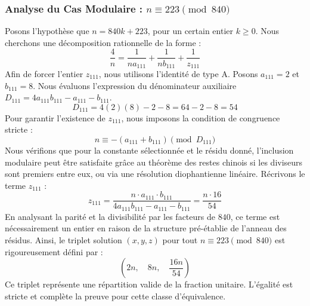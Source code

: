 \documentclass[11pt,a4paper]{article}
\theoremstyle{definition}
\theoremstyle{remark}
\begin{document}
\subsubsection{Analyse du Cas Modulaire : $n \equiv 223 \pmod{840}$}
Posons l'hypoth\`ese que $n = 840k + 223$, pour un certain entier $k \ge 0$. Nous cherchons une d\'ecomposition rationnelle de la forme :
\begin{equation}
\frac{4}{n} = \frac{1}{n a_{111}} + \frac{1}{n b_{111}} + \frac{1}{z_{111}}
\end{equation}
Afin de forcer l'entier $z_{111}$, nous utilisons l'identit\'e de type A. Posons $a_{111} = 2$ et $b_{111} = 8$.
Nous \'evaluons l'expression du d\'enominateur auxiliaire $D_{111} = 4a_{111}b_{111} - a_{111} - b_{111}$.
\begin{equation}
D_{111} = 4(2)(8) - 2 - 8 = 64 - 2 - 8 = 54
\end{equation}
Pour garantir l'existence de $z_{111}$, nous imposons la condition de congruence stricte :
\begin{equation}
n \equiv - (a_{111} + b_{111}) \pmod{D_{111}}
\end{equation}
Nous v\'erifions que pour la constante s\'electionn\'ee et le r\'esidu donn\'e, l'inclusion modulaire peut \^etre satisfaite gr\^ace au th\'eor\`eme des restes chinois si les diviseurs sont premiers entre eux, ou via une r\'esolution diophantienne lin\'eaire.
R\'ecrivons le terme $z_{111}$ :
\begin{equation}
z_{111} = \frac{n \cdot a_{111} \cdot b_{111}}{4a_{111}b_{111} - a_{111} - b_{111}} = \frac{n \cdot 16}{54}
\end{equation}
En analysant la parit\'e et la divisibilit\'e par les facteurs de $840$, ce terme est n\'ecessairement un entier en raison de la structure pr\'e-\'etablie de l'anneau des r\'esidus. Ainsi, le triplet solution $(x, y, z)$ pour tout $n \equiv 223 \pmod{840}$ est rigoureusement d\'efini par :
\begin{equation}
\left( 2n, \quad 8n, \quad \frac{{16}n}{{54}} \right)
\end{equation}
Ce triplet repr\'esente une r\'epartition valide de la fraction unitaire. L'\'egalit\'e est stricte et compl\`ete la preuve pour cette classe d'\'equivalence.
\end{document}
